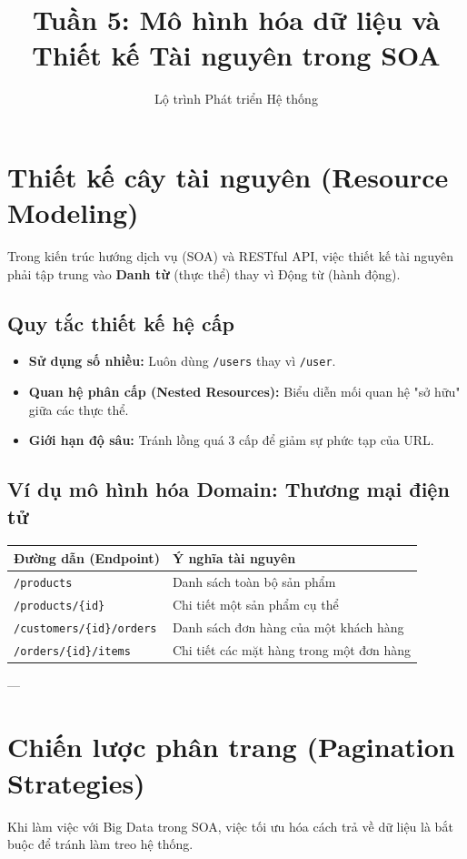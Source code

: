 \documentclass[12pt, a4paper]{article}
\title{\textbf{Tuần 5: Mô hình hóa dữ liệu và Thiết kế Tài nguyên trong SOA}}
\author{Lộ trình Phát triển Hệ thống}
\begin{document}
\maketitle

\section{Thiết kế cây tài nguyên (Resource Modeling)}
Trong kiến trúc hướng dịch vụ (SOA) và RESTful API, việc thiết kế tài nguyên phải tập trung vào \textbf{Danh từ} (thực thể) thay vì Động từ (hành động).

\subsection{Quy tắc thiết kế hệ cấp}
\begin{itemize}
    \item \textbf{Sử dụng số nhiều:} Luôn dùng \texttt{/users} thay vì \texttt{/user}.
    \item \textbf{Quan hệ phân cấp (Nested Resources):} Biểu diễn mối quan hệ "sở hữu" giữa các thực thể. 
    \item \textbf{Giới hạn độ sâu:} Tránh lồng quá 3 cấp để giảm sự phức tạp của URL.
\end{itemize}

\subsection{Ví dụ mô hình hóa Domain: Thương mại điện tử}
\begin{table}[h!]
\centering
\begin{tabular}{ll}
\toprule
\textbf{Đường dẫn (Endpoint)} & \textbf{Ý nghĩa tài nguyên} \\
\midrule
\texttt{/products} & Danh sách toàn bộ sản phẩm \\
\texttt{/products/\{id\}} & Chi tiết một sản phẩm cụ thể \\
\texttt{/customers/\{id\}/orders} & Danh sách đơn hàng của một khách hàng \\
\texttt{/orders/\{id\}/items} & Chi tiết các mặt hàng trong một đơn hàng \\
\bottomrule
\end{tabular}
\end{table}

---

\section{Chiến lược phân trang (Pagination Strategies)}
Khi làm việc với Big Data trong SOA, việc tối ưu hóa cách trả về dữ liệu là bắt buộc để tránh làm treo hệ thống.
\end{document}
